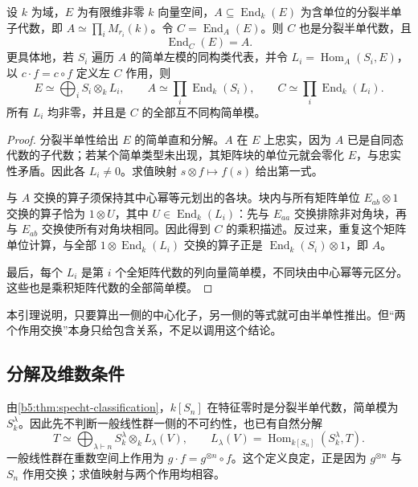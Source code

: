 \begin{lemma}[分裂半单代数的双中心化子]\label{b5:lem:split-double-centralizer}
	设 \(k\) 为域，\(E\) 为有限维非零 \(k\) 向量空间，\(A\subseteq\operatorname{End}_k(E)\) 为含单位的分裂半单子代数，即 \(A\simeq\prod_iM_{r_i}(k)\)。令 \(C=\operatorname{End}_A(E)\)。则 \(C\) 也是分裂半单代数，且
	\[
		\operatorname{End}_C(E)=A.
	\]
	更具体地，若 \(S_i\) 遍历 \(A\) 的简单左模的同构类代表，并令 \(L_i=\operatorname{Hom}_A(S_i,E)\)，以 \(c\cdot f=c\circ f\) 定义左 \(C\) 作用，则
	\[
		E\simeq\bigoplus_i S_i\otimes_k L_i,\qquad A\simeq\prod_i\operatorname{End}_k(S_i),\qquad C\simeq\prod_i\operatorname{End}_k(L_i).
	\]
	所有 \(L_i\) 均非零，并且是 \(C\) 的全部互不同构简单模。
\end{lemma}
\begin{proof}
	分裂半单性给出 \(E\) 的简单直和分解。\(A\) 在 \(E\) 上忠实，因为 \(A\) 已是自同态代数的子代数；若某个简单类型未出现，其矩阵块的单位元就会零化 \(E\)，与忠实性矛盾。因此各 \(L_i\ne0\)。求值映射 \(s\otimes f\mapsto f(s)\) 给出第一式。

	与 \(A\) 交换的算子须保持其中心幂等元划出的各块。块内与所有矩阵单位 \(E_{ab}\otimes1\) 交换的算子恰为 \(1\otimes U\)，其中 \(U\in\operatorname{End}_k(L_i)\)：先与 \(E_{aa}\) 交换排除非对角块，再与 \(E_{ab}\) 交换使所有对角块相同。因此得到 \(C\) 的乘积描述。反过来，重复这个矩阵单位计算，与全部 \(1\otimes\operatorname{End}_k(L_i)\) 交换的算子正是 \(\operatorname{End}_k(S_i)\otimes1\)，即 \(A\)。

	最后，每个 \(L_i\) 是第 \(i\) 个全矩阵代数的列向量简单模，不同块由中心幂等元区分。这些也是乘积矩阵代数的全部简单模。
\end{proof}

本引理说明，只要算出一侧的中心化子，另一侧的等式就可由半单性推出。但“两个作用交换”本身只给包含关系，不足以调用这个结论。

\subsection{分解及维数条件}
\label{b5:subsec:0703:03}

由\cref{b5:thm:specht-classification}，\(k[S_n]\) 在特征零时是分裂半单代数，简单模为 \(S^\lambda_k\)。因此先不判断一般线性群一侧的不可约性，也已有自然分解
\begin{equation}\label{b5:eq:tensor-isotypic}
	T\simeq\bigoplus_{\lambda\vdash n}S^\lambda_k\otimes_k L_\lambda(V), \qquad L_\lambda(V)=\operatorname{Hom}_{k[S_n]}(S^\lambda_k,T).
\end{equation}
一般线性群在重数空间上作用为 \(g\cdot f=g^{\otimes n}\circ f\)。这个定义良定，正是因为 \(g^{\otimes n}\) 与 \(S_n\) 作用交换；求值映射与两个作用均相容。

